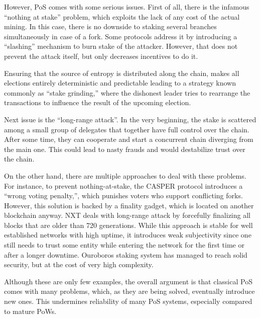 However, PoS comes with some serious issues. First of all, there is the infamous
``nothing at stake''\cite{pos_flaws_nothing} problem, which exploits the lack of
any cost of the actual mining. In this case, there is no downside to staking
several branches simultaneously in case of a fork. Some protocols address it by
introducing a ``slashing'' mechanism to burn stake of the
attacker\cite{eth_slashing}. However, that does not prevent the attack itself,
but only decreases incentives to do it.

Ensuring that the source of entropy is distributed along the chain, makes all
elections entirely deterministic and predictable leading to a strategy known
commonly as ``stake grinding,'' where the dishonest leader tries to rearrange the
transactions to influence the result of the upcoming election.

Next issue is the ``long-range attack''\cite{pos_flaws_long}. In the very
beginning, the stake is scattered among a small group of delegates that together
have full control over the chain. After some time, they can cooperate and start
a concurrent chain diverging from the main one. This could lead to nasty frauds
and would destabilize trust over the chain.

On the other hand, there are multiple approaches to deal with these problems.
For instance, to prevent nothing-at-stake, the CASPER protocol introduces a
``wrong voting penalty,'', which punishes voters who support conflicting
forks\cite{casper}. However, this solution is backed by a finality gadget, which
is located on another blockchain anyway. NXT deals with long-range attack by
forcefully finalizing all blocks that are older than 720 generations\cite{nxt}.
While this approach is stable for well established networks with high uptime, it
introduces weak subjectivity since one still needs to trust some entity while
entering the network for the first time or after a longer downtime. Ouroboros
staking system has managed to reach solid security, but at the cost of very high
complexity\cite{ouroboros}.

Although these are only few examples, the overall argument is that classical PoS
comes with many problems, which, as they are being solved, eventually introduce
new ones. This undermines reliability of many PoS systems, especially compared
to mature PoWs.
